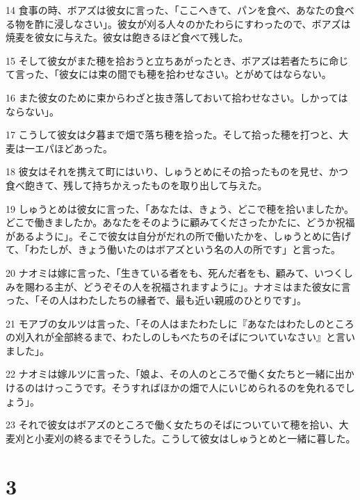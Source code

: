 \par 14 食事の時、ボアズは彼女に言った、「ここへきて、パンを食べ、あなたの食べる物を酢に浸しなさい」。彼女が刈る人々のかたわらにすわったので、ボアズは焼麦を彼女に与えた。彼女は飽きるほど食べて残した。
\par 15 そして彼女がまた穂を拾おうと立ちあがったとき、ボアズは若者たちに命じて言った、「彼女には束の間でも穂を拾わせなさい。とがめてはならない。
\par 16 また彼女のために束からわざと抜き落しておいて拾わせなさい。しかってはならない」。
\par 17 こうして彼女は夕暮まで畑で落ち穂を拾った。そして拾った穂を打つと、大麦は一エパほどあった。
\par 18 彼女はそれを携えて町にはいり、しゅうとめにその拾ったものを見せ、かつ食べ飽きて、残して持ちかえったものを取り出して与えた。
\par 19 しゅうとめは彼女に言った、「あなたは、きょう、どこで穂を拾いましたか。どこで働きましたか。あなたをそのように顧みてくださったかたに、どうか祝福があるように」。そこで彼女は自分がだれの所で働いたかを、しゅうとめに告げて、「わたしが、きょう働いたのはボアズという名の人の所です」と言った。
\par 20 ナオミは嫁に言った、「生きている者をも、死んだ者をも、顧みて、いつくしみを賜わる主が、どうぞその人を祝福されますように」。ナオミはまた彼女に言った、「その人はわたしたちの縁者で、最も近い親戚のひとりです」。
\par 21 モアブの女ルツは言った、「その人はまたわたしに『あなたはわたしのところの刈入れが全部終るまで、わたしのしもべたちのそばについていなさい』と言いました」。
\par 22 ナオミは嫁ルツに言った、「娘よ、その人のところで働く女たちと一緒に出かけるのはけっこうです。そうすればほかの畑で人にいじめられるのを免れるでしょう」。
\par 23 それで彼女はボアズのところで働く女たちのそばについていて穂を拾い、大麦刈と小麦刈の終るまでそうした。こうして彼女はしゅうとめと一緒に暮した。

\chapter{3}

